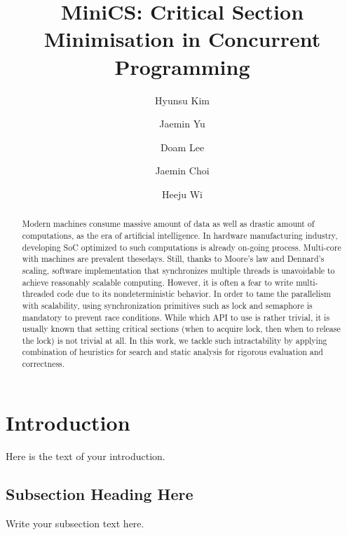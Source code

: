 \documentclass[sigconf]{acmart}
\begin{document}
\title{MiniCS: Critical Section Minimisation in Concurrent Programming}
\author{Hyunsu Kim}

\author{Jaemin Yu}

\author{Doam Lee}

\author{Jaemin Choi}

\author{Heeju Wi}

\begin{abstract}
Modern machines consume massive amount of data as well as drastic amount of computations, as the era of artificial intelligence. In hardware manufacturing industry, developing SoC optimized to such computations is already on-going process. Multi-core with machines are prevalent thesedays. Still, thanks to Moore's law and Dennard's scaling, software implementation that synchronizes multiple threads is unavoidable to achieve reasonably scalable computing. However, it is often a fear to write multi-threaded code due to its nondeterministic behavior. In order to tame the parallelism with scalability, using synchronization primitives such as lock and semaphore is mandatory to prevent race conditions. While which API to use is rather trivial, it is usually known that setting critical sections (when to acquire lock, then when to release the lock) is not trivial at all. In this work, we tackle such intractability by applying combination of heuristics for search and static analysis for rigorous evaluation and correctness.
\end{abstract}

\maketitle

\section{Introduction}
Here is the text of your introduction.

\subsection{Subsection Heading Here}
Write your subsection text here.
\end{document}
